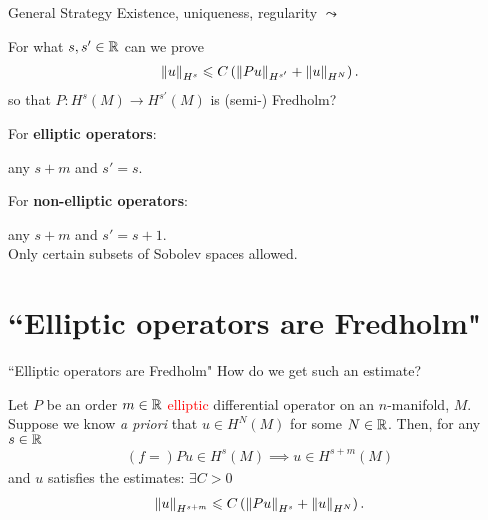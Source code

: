 \documentclass{beamer}
\begin{document}
\begin{frame}{General Strategy}
Existence, uniqueness, regularity $\leadsto$ 
\begin{block}{} 
     For what $s, s' \in \R$ can we prove 
     \begin{align*}
     \norm[u]_{H^s} \leq C \brac{\norm[Pu]_{H^{s'}} + \norm[u]_{H^{N}}}. 
     \end{align*}  
     so that $P: H^s(M) \to H^{s'}(M)$ is (semi-) Fredholm? 
\end{block}

For \textbf{elliptic operators}: 
\begin{center}
    any $s + m$ and $s' = s$. 
\end{center}
For \textbf{non-elliptic operators}: 
\begin{center}
    any $s + m$ and $s' = s + 1$. \\
    Only certain subsets of Sobolev spaces allowed. 
\end{center}

\end{frame} 


\section{``Elliptic operators are Fredholm"} 
\begin{frame}{``Elliptic operators are Fredholm"} 
How do we get such an estimate? 

\begin{theorem}
    Let $P$ be an order $m \in \R$ \textcolor<2->{red}{ elliptic}
    differential operator on an $n$-manifold, $M$. Suppose we know \textit{a priori} that $u \in H^{N}(M)$ for some $N \in \R$. Then, for any $s \in \R$
    \begin{align*}
    (f = ) Pu \in H^{s}(M) \implies u \in H^{s + m}(M)
    \end{align*}
    and $u$ satisfies the estimates: $\exists C > 0$
    \begin{align*}
    \norm[u]_{H^{s + m}} \leq C \brac{\norm[Pu]_{H^s} + \norm[u]_{H^N}}. 
    \end{align*}
\end{theorem}

\end{frame} 
\end{document}
